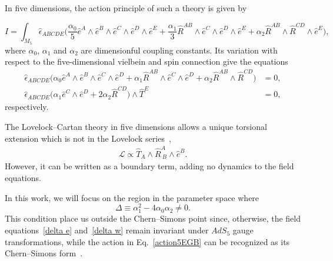 \documentclass[aps,prd,12pt,superscriptaddress,showpacs,showkeys,longbibliography,reprint,nofootinbib]{revtex4-1}
\begin{document}
In five dimensions, the action principle of such a theory is given by  
\begin{widetext}
  \begin{equation}
    \label{action5EGB}
    I = \int_{M_5} \hat{\epsilon}_{ABCDE} \Big(\frac{\alpha_0}{5}\hat{e}^A\wedge\hat{e}^B\wedge\hat{e}^C\wedge
    \hat{e}^D\wedge\hat{e}^E
    +\frac{\alpha_1}{3}\hat{R}^{AB}\wedge\hat{e}^C\wedge\hat{e}^D\wedge\hat{e}^E
    +\alpha_2\hat{R}^{AB}\wedge\hat{R}^{CD}
    \wedge\hat{e}^E\Big),
  \end{equation}
  where $\alpha_0$, $\alpha_1$ and $\alpha_2$ are dimensionful coupling constants. Its variation with respect to the five-dimensional vielbein and spin connection give the equations
  \begin{align}
    \label{delta e}
    \hat{\epsilon}_{ABCDE}\Big(\alpha_0\hat{e}^A\wedge\hat{e}^B\wedge\hat{e}^C\wedge\hat{e}^D
    + \alpha_1\hat{R}^{AB}\wedge\hat{e}^C\wedge\hat{e}^D
    + \alpha_2\hat{R}^{AB}\wedge\hat{R}^{CD}\Big)&=0,
    \\
    \label{delta w}
    \hat{\epsilon}_{ABCDE}\Big(\alpha_1\hat{e}^C\wedge\hat{e}^D+
    2\alpha_2\hat{R}^{CD}\Big)\wedge\hat{T}^E&=0,
  \end{align}
  respectively.
\end{widetext}

The Lovelock--Cartan theory in five dimensions allows a unique torsional extension which is not in the Lovelock series~\cite{Mardones:1990qc},
\begin{align}
  \label{boundary}
  \mathcal{L} \propto \hat{T}_A\wedge \hat{R}^A_{\ B}\wedge\hat{e}^B.
\end{align}
However, it can be written as a boundary term, adding no dynamics to the field equations.

In this work, we will focus on the region in the parameter space where
\begin{equation}\label{delta}
  \Delta\equiv\alpha_1^2-4\alpha_0\alpha_2\neq 0.
\end{equation}
This condition place us outside the Chern--Simons point since, otherwise, the field equations~\eqref{delta e} and~\eqref{delta w} remain invariant under $AdS_5$ gauge transformations, while the action in Eq.~\eqref{action5EGB} can be recognized as its Chern--Simons form~\cite{Zanelli:2005sa,Troncoso:1999pk}. 
\end{document}
